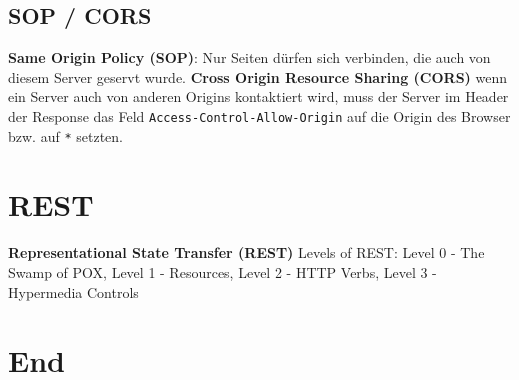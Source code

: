 \documentclass[11pt,twoside,landscape]{article}
\begin{document}
\begin{multicols}{4}
\subsection{SOP / CORS}
\label{sec:org603d785}
\textbf{Same Origin Policy (SOP)}: Nur Seiten dürfen sich verbinden, die auch von diesem Server geservt wurde. \textbf{Cross Origin Resource Sharing (CORS)} wenn ein Server auch von anderen Origins kontaktiert wird, muss der Server im Header der Response das Feld \texttt{Access-Control-Allow-Origin} auf die Origin des Browser bzw. auf \texttt{*} setzten.


\section{REST}
\label{sec:orgc88aa8b}
\textbf{Representational State Transfer (REST)}
Levels of REST: Level 0 - The Swamp of POX, Level 1 - Resources, Level 2 - HTTP Verbs, Level 3 - Hypermedia Controls

\section{End}
\label{sec:orgd09f24e}
\end{multicols}
\end{document}
